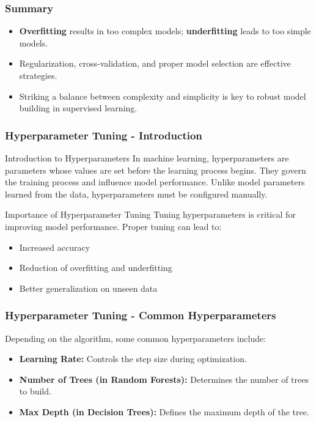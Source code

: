 \documentclass[aspectratio=169]{beamer}
\begin{document}
\begin{frame}[fragile]
    \frametitle{Summary}
    \begin{itemize}
        \item \textbf{Overfitting} results in too complex models; \textbf{underfitting} leads to too simple models.
        \item Regularization, cross-validation, and proper model selection are effective strategies.
        \item Striking a balance between complexity and simplicity is key to robust model building in supervised learning.
    \end{itemize}
\end{frame}

\begin{frame}[fragile]
    \frametitle{Hyperparameter Tuning - Introduction}
    \begin{block}{Introduction to Hyperparameters}
        In machine learning, hyperparameters are parameters whose values are set before the learning process begins. 
        They govern the training process and influence model performance. Unlike model parameters learned from the data, 
        hyperparameters must be configured manually.
    \end{block}
    
    \begin{block}{Importance of Hyperparameter Tuning}
        Tuning hyperparameters is critical for improving model performance. Proper tuning can lead to:
        \begin{itemize}
            \item Increased accuracy
            \item Reduction of overfitting and underfitting
            \item Better generalization on unseen data
        \end{itemize}
    \end{block}
\end{frame}

\begin{frame}[fragile]
    \frametitle{Hyperparameter Tuning - Common Hyperparameters}
    Depending on the algorithm, some common hyperparameters include:
    \begin{itemize}
        \item \textbf{Learning Rate:} Controls the step size during optimization.
        \item \textbf{Number of Trees (in Random Forests):} Determines the number of trees to build.
        \item \textbf{Max Depth (in Decision Trees):} Defines the maximum depth of the tree.
    \end{itemize}
\end{frame}
\end{document}
